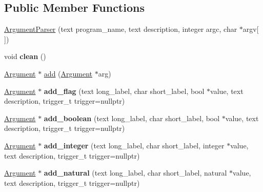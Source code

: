 \subsection*{Public Member Functions}
\begin{DoxyCompactItemize}
\item 
\hyperlink{classez_1_1arguments_1_1ArgumentParser_a30376da1d4671529adc656a9feee49e7}{Argument\+Parser} (text program\+\_\+name, text description, integer argc, char $\ast$argv\mbox{[}$\,$\mbox{]})
\item 
\mbox{\label{classez_1_1arguments_1_1ArgumentParser_a04f55da04f5da57dec7ec34ca96c0ad1}} 
void {\bfseries clean} ()
\item 
\hyperlink{classez_1_1arguments_1_1Argument}{Argument} $\ast$ \hyperlink{classez_1_1arguments_1_1ArgumentParser_aa14a00ee3b14e5d3c4ffa5b409d03274}{add} (\hyperlink{classez_1_1arguments_1_1Argument}{Argument} $\ast$arg)
\item 
\mbox{\label{classez_1_1arguments_1_1ArgumentParser_a27ef9198a0bdd6c39a2897712ad402b4}} 
\hyperlink{classez_1_1arguments_1_1Argument}{Argument} $\ast$ {\bfseries add\+\_\+flag} (text long\+\_\+label, char short\+\_\+label, bool $\ast$value, text description, trigger\+\_\+t trigger=nullptr)
\item 
\mbox{\label{classez_1_1arguments_1_1ArgumentParser_addffdc87f5acb326b7b64b5144395c42}} 
\hyperlink{classez_1_1arguments_1_1Argument}{Argument} $\ast$ {\bfseries add\+\_\+boolean} (text long\+\_\+label, char short\+\_\+label, bool $\ast$value, text description, trigger\+\_\+t trigger=nullptr)
\item 
\mbox{\label{classez_1_1arguments_1_1ArgumentParser_a83b1d6bcdb92004d97776a45ef8c17d7}} 
\hyperlink{classez_1_1arguments_1_1Argument}{Argument} $\ast$ {\bfseries add\+\_\+integer} (text long\+\_\+label, char short\+\_\+label, integer $\ast$value, text description, trigger\+\_\+t trigger=nullptr)
\item 
\mbox{\label{classez_1_1arguments_1_1ArgumentParser_abd978af3aacae6c47a019bad89b6afde}} 
\hyperlink{classez_1_1arguments_1_1Argument}{Argument} $\ast$ {\bfseries add\+\_\+natural} (text long\+\_\+label, char short\+\_\+label, natural $\ast$value, text description, trigger\+\_\+t trigger=nullptr)

\end{DoxyCompactItemize}
